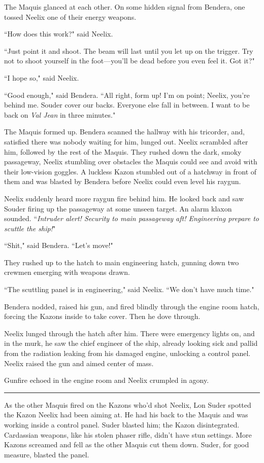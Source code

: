 \documentclass[twoside,letterpaper,12pt]{memoir}
\begin{document}
The Maquis glanced at each other. On some hidden signal from Bendera, one tossed Neelix one of their energy weapons.

``How does this work?" said Neelix.

``Just point it and shoot. The beam will last until you let up on the trigger. Try not to shoot yourself in the foot---you'll be dead before you even feel it. Got it?"

``I hope so," said Neelix.

``Good enough," said Bendera. ``All right, form up! I'm on point; Neelix, you're behind me. Souder cover our backs. Everyone else fall in between. I want to be back on \textit{Val Jean} in three minutes."

The Maquis formed up. Bendera scanned the hallway with his tricorder, and, satisfied there was nobody waiting for him, lunged out. Neelix scrambled after him, followed by the rest of the Maquis. They rushed down the dark, smoky passageway, Neelix stumbling over obstacles the Maquis could see and avoid with their low-vision goggles. A luckless Kazon stumbled out of a hatchway in front of them and was blasted by Bendera before Neelix could even level his raygun.

Neelix suddenly heard more raygun fire behind him. He looked back and saw Souder firing up the passageway at some unseen target. An alarm klaxon sounded. ``\textit{Intruder alert! Security to main passageway aft! Engineering prepare to scuttle the ship!}"

``Shit," said Bendera. ``Let's move!"

They rushed up to the hatch to main engineering hatch, gunning down two crewmen emerging with weapons drawn.

``The scuttling panel is in engineering," said Neelix. ``We don't have much time."

Bendera nodded, raised his gun, and fired blindly through the engine room hatch, forcing the Kazons inside to take cover. Then he dove through.

Neelix lunged through the hatch after him. There were emergency lights on, and in the murk, he saw the chief engineer of the ship, already looking sick and pallid from the radiation leaking from his damaged engine, unlocking a control panel. Neelix raised the gun and aimed center of mass.

Gunfire echoed in the engine room and Neelix crumpled in agony.

\fancybreak{\rule{3cm}{0.4 pt}}
As the other Maquis fired on the Kazons who'd shot Neelix, Lon Suder spotted the Kazon Neelix had been aiming at. He had his back to the Maquis and was working inside a control panel. Suder blasted him; the Kazon disintegrated. Cardassian weapons, like his stolen phaser rifle, didn't have stun settings. More Kazons screamed and fell as the other Maquis cut them down. Suder, for good measure, blasted the panel.
\end{document}
